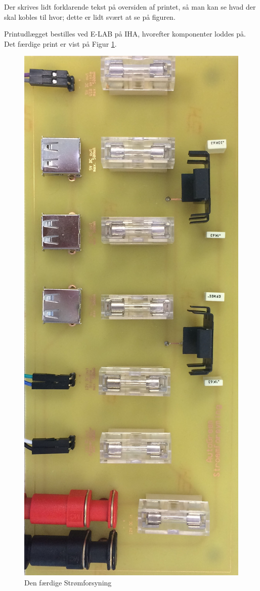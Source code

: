 Der skrives lidt forklarende tekst på oversiden af printet, så man kan se hvad der skal kobles til hvor; dette er lidt svært at se på figuren.

\mbox{}

Printudlægget bestilles ved E-LAB på IHA, hvorefter komponenter loddes på.
Det færdige print er vist på Figur \ref{fig:stroemforsyning_print}.

\begin{figure}[h]
\centering 
\includegraphics[width={\textwidth}, trim=0 0 0 0, clip=true] {../fig/StroemforsyningPrintBillede}
\caption{Den færdige Strømforsyning}
\label{fig:stroemforsyning_print}
\end{figure} 

\clearpage
